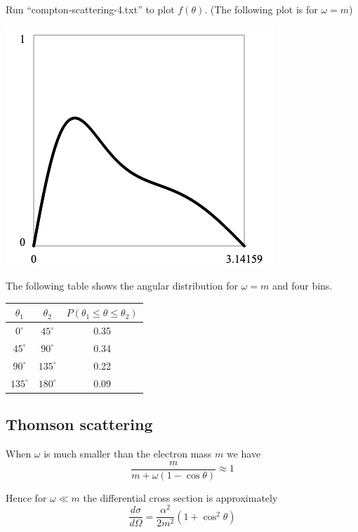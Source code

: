 \documentclass[12pt]{article}
\begin{document}
\noindent
Run ``compton-scattering-4.txt'' to plot $f(\theta)$.
(The following plot is for $\omega=m$)

\begin{center}
\includegraphics[scale=0.5]{compton-scattering.png}
\end{center}

\noindent
The following table shows the angular distribution for $\omega=m$ and four bins.

\begin{center}
\begin{tabular}{|c|c|c|}
\hline
$\theta_1$ & $\theta_2$ & $P(\theta_1\le\theta\le\theta_2)$\\
\hline
$0^\circ$ & $45^\circ$ & 0.35 \\
$45^\circ$ & $90^\circ$ & 0.34 \\
$90^\circ$ & $135^\circ$ & 0.22 \\
$135^\circ$ & $180^\circ$ & 0.09 \\
\hline
\end{tabular}
\end{center}

\subsection*{Thomson scattering}
When $\omega$ is much smaller than the electron mass $m$ we have
\begin{equation*}
\frac{m}{m+\omega(1-\cos\theta)}\approx1
\end{equation*}

\noindent
Hence for $\omega\ll m$ the differential cross section is approximately
\begin{equation*}
\frac{d\sigma}{d\Omega}=\frac{\alpha^2}{2m^2}(1+\cos^2\theta)
\end{equation*}
\end{document}
